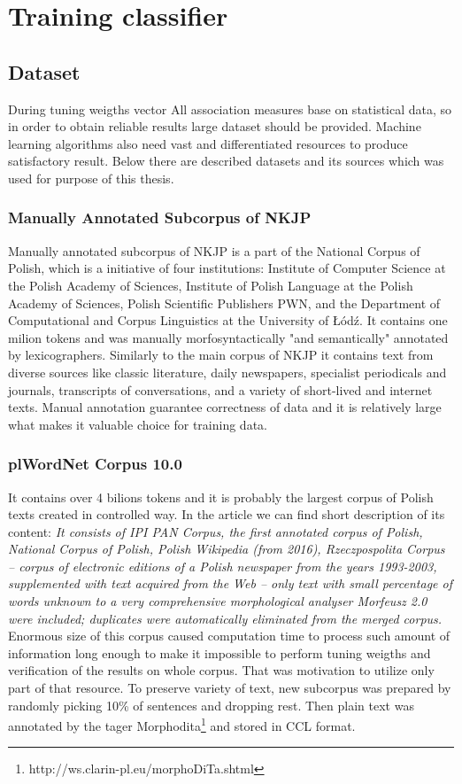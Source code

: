 \chapter{Training classifier}

\section{Dataset}\label{dataset}
During tuning weigths vector 
All association measures base on statistical data, so in order to obtain reliable results large dataset should be provided.
Machine learning algorithms also need vast and differentiated resources to produce satisfactory result.
Below there are described datasets and its sources which was used for purpose of this thesis.

\subsection{Manually Annotated Subcorpus of NKJP}
Manually annotated subcorpus of NKJP is a part of the National Corpus of Polish, which is a initiative of four institutions: 
Institute of Computer Science at the Polish Academy of Sciences, Institute of Polish Language at the Polish Academy of Sciences, 
Polish Scientific Publishers PWN, and the Department of Computational and Corpus Linguistics at the University of Łódź.
It contains one milion tokens and was manually morfosyntactically "and semantically" annotated by lexicographers. 
Similarly to the main corpus of NKJP it contains text from diverse sources like classic literature, daily newspapers, 
specialist periodicals and journals, transcripts of conversations, and a variety of short-lived and internet texts. 
Manual annotation guarantee correctness of data and it is relatively large what makes it valuable choice for training data.

\subsection{plWordNet Corpus 10.0}

It contains over 4 bilions tokens and it is probably the largest corpus of Polish texts created in controlled way. 
In the article \cite{kgr10} we can find short description of its content: \emph{It consists of IPI PAN Corpus, 
the first annotated corpus of Polish,  National Corpus of Polish, Polish Wikipedia (from 2016), Rzeczpospolita Corpus 
-- corpus of electronic editions of a Polish newspaper from the years 1993-2003, supplemented with text acquired from the Web 
-- only text with small percentage of words unknown to a very comprehensive morphological analyser Morfeusz 2.0 
were included; duplicates were automatically eliminated from the merged corpus.}
Enormous size of this corpus caused computation time to process such amount of information 
long enough to make it impossible to perform tuning weigths and verification of the results on whole corpus. 
That was motivation to utilize only part of that resource. To preserve variety of text, new subcorpus was prepared by randomly picking 
10\% of sentences and dropping rest. Then plain text was annotated by the tager Morphodita\footnote{http://ws.clarin-pl.eu/morphoDiTa.shtml} and stored in CCL format.


